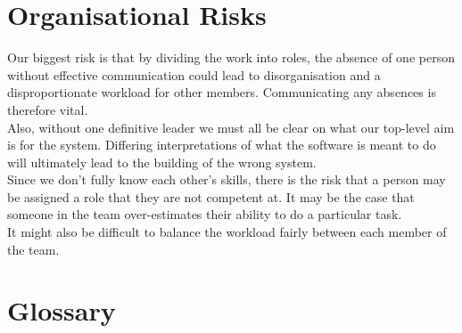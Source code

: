 \documentclass{l3deliverable}
\begin{document}

\section{Organisational Risks}

Our biggest risk is that by dividing the work into roles, the absence of one person without effective communication could lead to disorganisation and a disproportionate workload for other members. Communicating any absences is therefore vital.
\\
Also, without one definitive leader we must all be clear on what our top-level aim is for the system. Differing interpretations of what the software is meant to do will ultimately lead to the building of the wrong system.
\\
Since we don't fully know each other's skills, there is the risk that a person may be assigned a role that they are not competent at. It may be the case that someone in the team over-estimates their ability to do a particular task. 
\\
It might also be difficult to balance the workload fairly between each member of the team. 


\appendix


\section{Glossary}




\end{document}
